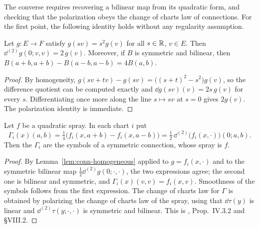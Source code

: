 The converse requires recovering a bilinear map from its quadratic form, and checking that the
polarization obeys the change of charts law of connections. For the first point, the following
identity holds without any regularity assumption.

\begin{lemma}
  \label{lem:conn-homogeneous}
  \leanok
  Let $g \colon E \to F$ satisfy $g(s v) = s^2 g(v)$ for all $s \in \mathbb{R}$, $v \in E$. Then
  $\dd^{(2)} g(0; v, v) = 2\, g(v)$. Moreover, if $B$ is symmetric and bilinear, then
  $B(a + b, a + b) - B(a - b, a - b) = 4 B(a, b)$.
\end{lemma}

\begin{proof}
  \leanok
  By homogeneity, $g(s v + t v) - g(s v) = \bigl((s + t)^2 - s^2\bigr) g(v)$, so the difference
  quotient can be computed exactly and $\dd g(s v)(v) = 2 s\, g(v)$ for every $s$.
  Differentiating once more along the line $s \mapsto s v$ at $s = 0$ gives $2 g(v)$. The
  polarization identity is immediate.
\end{proof}

\begin{theorem}
  \label{thm:conn-spray-to-connection}
  \leanok
  Let $f$ be a quadratic spray. In each chart $i$ put
  \[
    \Gamma_i(x)(a, b) = \tfrac14\bigl(f_i(x, a + b) - f_i(x, a - b)\bigr)
      = \tfrac12\, \dd^{(2)}\bigl(f_i(x, \cdot)\bigr)(0; a, b).
  \]
  Then the $\Gamma_i$ are the symbols of a symmetric connection, whose spray is $f$.
\end{theorem}

\begin{proof}
  \leanok
  By Lemma~\ref{lem:conn-homogeneous} applied to $g = f_i(x, \cdot)$ and to the symmetric
  bilinear map $\tfrac12 \dd^{(2)} g(0; \cdot, \cdot)$, the two expressions agree; the second one
  is bilinear and symmetric, and $\Gamma_i(x)(v, v) = f_i(x, v)$. Smoothness of the symbols
  follows from the first expression. The change of charts law for $\Gamma$ is obtained by
  polarizing the change of charts law of the spray, using that $\dd\tau(y)$ is linear and
  $\dd^{(2)}\tau(y; \cdot, \cdot)$ is symmetric and bilinear. This is \cite{Lan99}, Prop.~IV.3.2
  and \S VIII.2.
\end{proof}

